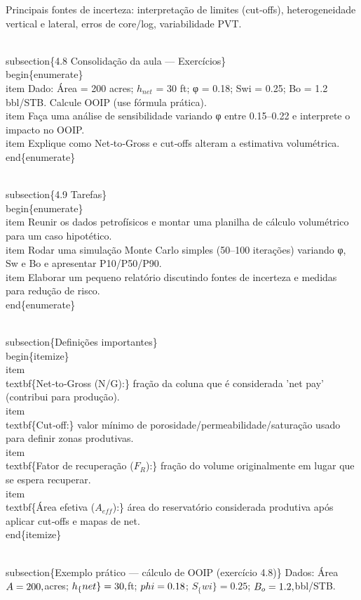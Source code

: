 \documentclass[11pt,a4paper]{article}
\begin{document}
\begin{enumerate}
{Principais fontes de incerteza: interpretação de limites (cut‑offs), heterogeneidade vertical e lateral, erros de core/log, variabilidade PVT.

\\subsection\{4.8 Consolidação da aula — Exercícios\}
\\begin\{enumerate\}
\\item Dado: Área = 200 acres; $h_{net}$ = 30 ft; φ = 0.18; Swi = 0.25; Bo = 1.2 bbl/STB. Calcule OOIP (use fórmula prática).
\\item Faça uma análise de sensibilidade variando φ entre 0.15–0.22 e interprete o impacto no OOIP.
\\item Explique como Net‑to‑Gross e cut‑offs alteram a estimativa volumétrica.
\\end\{enumerate\}

\\subsection\{4.9 Tarefas\}
\\begin\{enumerate\}
\\item Reunir os dados petrofísicos e montar uma planilha de cálculo volumétrico para um caso hipotético.
\\item Rodar uma simulação Monte Carlo simples (50–100 iterações) variando φ, Sw e Bo e apresentar P10/P50/P90.
\\item Elaborar um pequeno relatório discutindo fontes de incerteza e medidas para redução de risco.
\\end\{enumerate\}

\\subsection\{Definições importantes\}
\\begin\{itemize\}
\\item \\textbf\{Net‑to‑Gross (N/G):\} fração da coluna que é considerada 'net pay' (contribui para produção).
\\item \\textbf\{Cut‑off:\} valor mínimo de porosidade/permeabilidade/saturação usado para definir zonas produtivas.
\\item \\textbf\{Fator de recuperação ($F_{R}$):\} fração do volume originalmente em lugar que se espera recuperar.
\\item \\textbf\{Área efetiva ($A_{eff}$):\} área do reservatório considerada produtiva após aplicar cut‑offs e mapas de net.
\\end\{itemize\}

\\subsection\{Exemplo prático — cálculo de OOIP (exercício 4.8)\}
Dados: Área $A=200\\,$acres; $h_\{net\}=30\\,$ft; $\\phi=0.18$; $S_\{wi\}=0.25$; $B_o=1.2\\,$bbl/STB.

}
\end{enumerate}
\end{document}

